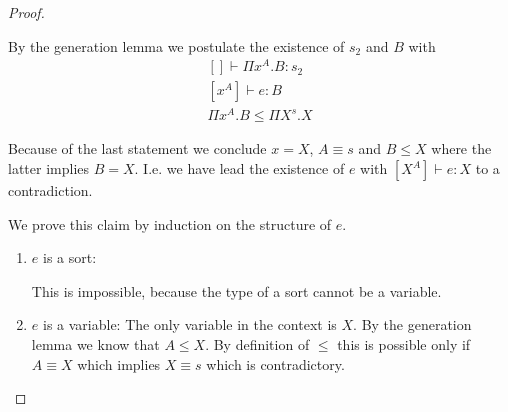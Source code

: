 \begin{theorem}
\begin{proof}
\begin{enumerate}
            By the generation lemma we postulate the existence of $s_2$ and $B$
                with
                $$
                \begin{array}{l}
                    [] \vdash \Pi x^A. B: s_2
                    \\
                    \text{$[x^A]$} \vdash e: B
                    \\
                    \Pi x^A. B \le \Pi X^s. X
                \end{array}
                $$

                Because of the last statement we conclude $x = X$, $A \equiv s$
                and $B \le X$ where the latter implies $B = X$. I.e. we have
                lead the existence of $e$ with $[X^A] \vdash e: X$ to a
                contradiction.

                We prove this claim by induction on the structure of $e$.
                \begin{enumerate}
                \item $e$ is a sort:

                    This is impossible, because the type of a sort cannot be a
                        variable.

                \item $e$ is a variable: The only variable in the context is
                    $X$. By the generation lemma we know that $A \le X$. By
                        definition of $\le$ this is possible only if $A \equiv
                        X$ which implies $X \equiv s$ which is contradictory.
                \end{enumerate}
        \end{enumerate}
    \end{proof}
\end{theorem}
